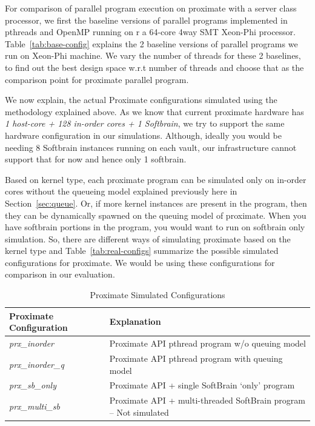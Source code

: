 For comparison of parallel program execution on proximate with
a server class processor, we first the baseline versions of parallel programs implemented in pthreads and OpenMP
running on r a 64-core 4way SMT Xeon-Phi processor.
Table~\ref{tab:base-config} explains the 2 baseline versions of parallel programs we run on Xeon-Phi machine.
We vary the number of threads for these 2 baselines, to find out the best design space w.r.t number of threads
and choose that as the comparison point for proximate parallel program.

We now explain, the actual Proximate configurations simulated using the methodology explained above. 
As we know that current proximate hardware has \emph{1 host-core + 128 in-order cores + 1 Softbrain}, we try
to support the same hardware configuration in our simulations. Although, ideally you would be needing 8 Softbrain 
instances running on each vault, our infrastructure cannot support that for now and hence only 1 softbrain.

Based on kernel type, each proximate program can be simulated only on in-order cores without the queueing model
explained previously here in Section~\ref{sec:queue}. Or, if more kernel instances are present in the program, then they 
can be dynamically spawned on the queuing model of proximate. When you have softbrain portions in the program, 
you would want to run on softbrain only simulation. So, there are different ways of simulating proximate based on the kernel
type and Table~\ref{tab:real-configs} summarize the possible simulated configurations for proximate. We would be using these
configurations for comparison in our evaluation. 


\begin{table}[]
  \centering
  \begin{tabular}{|l|l|}
    \hline
    \textbf{Proximate Configuration}               & \textbf{Explanation}                                                    \\ \hline
    \textit{prx\_inorder}                          & Proximate API pthread program w/o queuing model                         \\ \hline
    \textit{prx\_inorder\_q}                       & Proximate API pthread program with queuing model                        \\ \hline
    \textit{prx\_sb\_only}                         & Proximate API + single SoftBrain ‘only’ program                         \\ \hline
    {\color[HTML]{FE0000} \textit{prx\_multi\_sb}} & {\color[HTML]{FE0000} Proximate API + multi-threaded SoftBrain program -- Not simulated} \\ \hline
  \end{tabular}
  \caption{Proximate Simulated Configurations}
\label{tab"real-configs}
\end{table}
